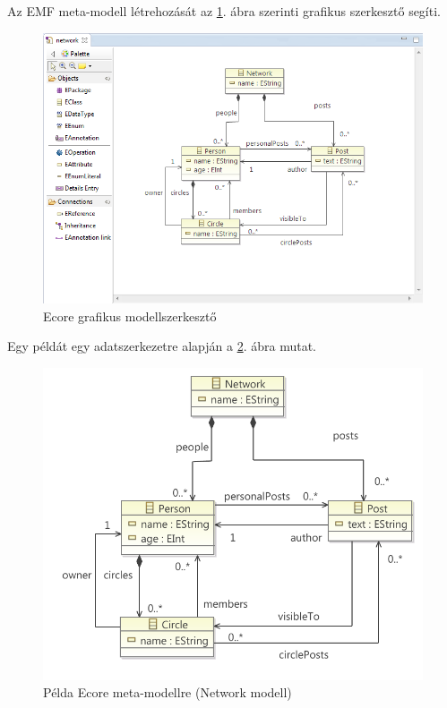 Az EMF meta-modell létrehozását az \ref{fig:EcoreDiagramEditor}. ábra szerinti grafikus szerkesztő segíti.
%
\begin{figure}[htb]
\centering
\includegraphics[width=\textwidth]{figures/ecore-diag-editor.png}
\caption{Ecore grafikus modellszerkesztő}
\label{fig:EcoreDiagramEditor}
\end{figure}
%
Egy példát egy adatszerkezetre \cite{VogelEMF} alapján a \ref{fig:EcoreMetaModelExample}. ábra mutat.
%
\begin{figure}[htb]
\centering
\includegraphics[width=\textwidth]{figures/ecore-network-metamodel-diag.pdf}
\caption{Példa Ecore meta-modellre (Network modell)}
\label{fig:EcoreMetaModelExample}
\end{figure}

